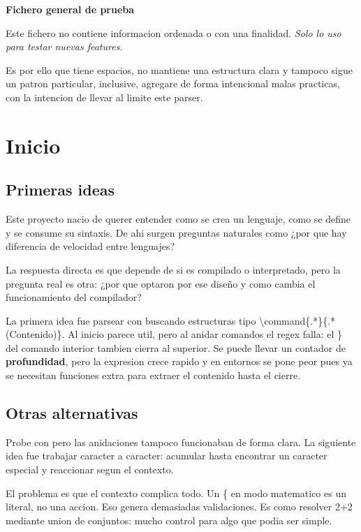 \documentclass{article}
\begin{document}
  \textbf{ Fichero general de prueba }

  Este fichero no contiene informacion ordenada o con una finalidad.
  \textit { Solo lo uso para testar nuevas features. } \newline

  Es por ello que tiene espacios, no mantiene una estructura clara y tampoco
  sigue un patron particular, inclusive, agregare de forma intencional malas
  practicas, con la intencion de llevar al limite este parser.

  \chapter{ Inicio }

\section{ Primeras ideas }

Este proyecto nacio de querer entender como se crea un lenguaje, como se define
y se consume su sintaxis. De ahi surgen preguntas naturales como ¿por que
hay diferencia de velocidad entre lenguajes?

La respuesta directa es que depende de si es compilado o interpretado, pero
la pregunta real es otra: ¿por que optaron por ese diseño y como cambia el
funcionamiento del compilador?

La primera idea fue parsear con  buscando estructuras tipo \backslash command\{.*\}\{.*(Contenido)\}.
Al inicio parece util, pero al anidar comandos el regex falla: el \} del comando
interior tambien cierra al superior. Se puede llevar un contador de \textbf{profundidad},
pero la expresion crece rapido y en entornos se pone peor pues ya se necesitan
funciones extra para extraer el contenido hasta el cierre.

\section{ Otras alternativas }

Probe con  pero las 
anidaciones tampoco funcionaban de forma clara.
La siguiente idea fue trabajar caracter a caracter: acumular hasta encontrar
un caracter especial y reaccionar segun el contexto.

El problema es que el contexto complica todo. Un \{ en modo matematico es un
literal, no una accion. Eso genera demasiadas validaciones. Es como resolver
2+2 mediante union de conjuntos: mucho control para algo que podia ser simple.
\end{document}
